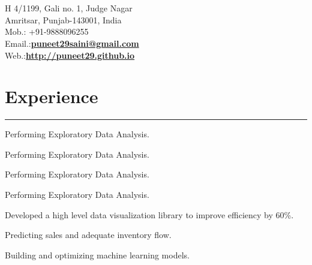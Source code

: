 \documentclass[]{puneet-resume}
\begin{document}
\hfill
\begin{minipage}[t]{0.66\textwidth}
\hspace*{0pt}\hfill    \\
\hspace*{0pt}\hfill    \\
\hspace*{0pt}\hfill H 4/1199, Gali no. 1, Judge Nagar \\
\hspace*{0pt}\hfill Amritsar, Punjab-143001, India \\
\hspace*{0pt}\hfill Mob.: +91-9888096255 \\
\hspace*{0pt}\hfill Email.:\textbf{\href{mailto:puneet29saini@gmail.com}{puneet29saini@gmail.com}} \\
\hspace*{0pt}\hfill Web.:\textbf{\href{http://puneet29.github.io}{http://puneet29.github.io}} 
\section{Experience}
\noindent\rule{12.5cm}{0.4pt}
 
\noindent
\hspace{5em}%
\begin{itemize}
\begin{minipage}{0.85\textwidth\vspace{2pt}}
	\item Performing Exploratory Data Analysis.
	\item Performing Exploratory Data Analysis.
	\item Performing Exploratory Data Analysis.
\end{minipage}
\end{itemize}
\sectionsep

 
\noindent
\hspace{5em}%
\begin{itemize}
\begin{minipage}{0.85\textwidth\vspace{2pt}}
	\item Performing Exploratory Data Analysis.
	\item Developed a high level data visualization library to improve efficiency by 60\%.
	\item Predicting sales and adequate inventory flow.
	\item Building and optimizing machine learning models.
\end{minipage}
\end{itemize}
\sectionsep


\end{minipage}
\end{document}
